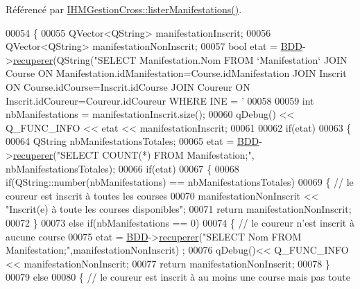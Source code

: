 Référencé par \hyperlink{class_i_h_m_gestion_cross_a0eadd8592c966c89bf7b5a25a0ae7589}{I\+H\+M\+Gestion\+Cross\+::lister\+Manifestations()}.


\begin{DoxyCode}
00054 \{
00055     QVector<QString> manifestationInscrit;
00056     QVector<QString> manifestationNonInscrit;
00057     \textcolor{keywordtype}{bool} etat = \hyperlink{class_gestion_b_d_d_a1bd17cbf5754eb6e54ae351f1d02dca2}{BDD}->\hyperlink{class_base_de_donnees_a77539baad389f5acf754cd2cd452403e}{recuperer}(QString(\textcolor{stringliteral}{"SELECT Manifestation.Nom FROM `Manifestation` JOIN
       Course ON Manifestation.idManifestation=Course.idManifestation JOIN Inscrit ON Course.idCourse=Inscrit.idCourse
       JOIN Coureur ON Inscrit.idCoureur=Coureur.idCoureur WHERE INE = '%
00058 
00059     \textcolor{keywordtype}{int} nbManifestations = manifestationInscrit.size();
00060     qDebug() << Q\_FUNC\_INFO << etat << manifestationInscrit;
00061 
00062     \textcolor{keywordflow}{if}(etat)
00063     \{
00064         QString nbManifestationsTotales;
00065         etat = \hyperlink{class_gestion_b_d_d_a1bd17cbf5754eb6e54ae351f1d02dca2}{BDD}->\hyperlink{class_base_de_donnees_a77539baad389f5acf754cd2cd452403e}{recuperer}(\textcolor{stringliteral}{"SELECT COUNT(*) FROM Manifestation;"}, nbManifestationsTotales);
00066         \textcolor{keywordflow}{if}(etat)
00067         \{
00068             \textcolor{keywordflow}{if}(QString::number(nbManifestations) == nbManifestationsTotales)
00069             \{ \textcolor{comment}{// le coureur est inscrit à toutes les courses}
00070                 manifestationNonInscrit << \textcolor{stringliteral}{"Inscrit(e) à toute les courses disponibles"};
00071                 \textcolor{keywordflow}{return} manifestationNonInscrit;
00072             \}
00073             \textcolor{keywordflow}{else} \textcolor{keywordflow}{if}(nbManifestations == 0)
00074             \{ \textcolor{comment}{// le coureur n'est inscrit à aucune course}
00075                 etat = \hyperlink{class_gestion_b_d_d_a1bd17cbf5754eb6e54ae351f1d02dca2}{BDD}->\hyperlink{class_base_de_donnees_a77539baad389f5acf754cd2cd452403e}{recuperer}(\textcolor{stringliteral}{"SELECT Nom FROM Manifestation;"},manifestationNonInscrit)
      ;
00076                 qDebug()<< Q\_FUNC\_INFO << manifestationNonInscrit;
00077                 \textcolor{keywordflow}{return} manifestationNonInscrit;
00078             \}
00079             \textcolor{keywordflow}{else}
00080             \{ \textcolor{comment}{// le coureur est inscrit à au moins une course mais pas toute}
}
\end{DoxyCode}
